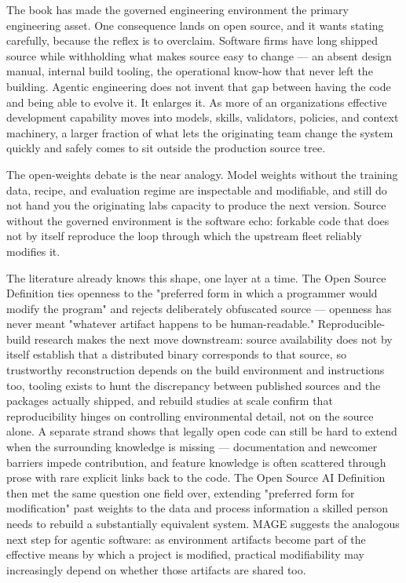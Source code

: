 

The book has made the governed engineering environment the primary engineering asset. One consequence lands on open source, and it wants stating carefully, because the reflex is to overclaim. Software firms have long shipped source while withholding what makes source easy to change --- an absent design manual, internal build tooling, the operational know-how that never left the building. Agentic engineering does not invent that gap between having the code and being able to evolve it. It enlarges it. As more of an organization\textquotesingle s effective development capability moves into models, skills, validators, policies, and context machinery, a larger fraction of what lets the originating team change the system quickly and safely comes to sit outside the production source tree.

The open-weights debate is the near analogy. Model weights without the training data, recipe, and evaluation regime are inspectable and modifiable, and still do not hand you the originating lab\textquotesingle s capacity to produce the next version. Source without the governed environment is the software echo: forkable code that does not by itself reproduce the loop through which the upstream fleet reliably modifies it.

The literature already knows this shape, one layer at a time. The Open Source Definition ties openness to the "preferred form in which a programmer would modify the program" and rejects deliberately obfuscated source\citep{osiOpenSourceDefinition} --- openness has never meant "whatever artifact happens to be human-readable." Reproducible-build research makes the next move downstream: source availability does not by itself establish that a distributed binary corresponds to that source, so trustworthy reconstruction depends on the build environment and instructions too,\citep{lamb2021reproducible}\citep{fourne2023reproducible} tooling exists to hunt the discrepancy between published sources and the packages actually shipped,\citep{vu2021lastpymile} and rebuild studies at scale confirm that reproducibility hinges on controlling environmental detail, not on the source alone.\citep{courtes2023guix}\citep{malka2025nix}\citep{sharma2025canonicalization} A separate strand shows that legally open code can still be hard to extend when the surrounding knowledge is missing --- documentation and newcomer barriers impede contribution,\citep{steinmacher2015barriers} and feature knowledge is often scattered through prose with rare explicit links back to the code.\citep{puhlfurss2022documentation} The Open Source AI Definition then met the same question one field over, extending "preferred form for modification" past weights to the data and process information a skilled person needs to rebuild a substantially equivalent system.\citep{osiOpenSourceAIDefinition} MAGE suggests the analogous next step for agentic software: as environment artifacts become part of the effective means by which a project is modified, practical modifiability may increasingly depend on whether those artifacts are shared too.

